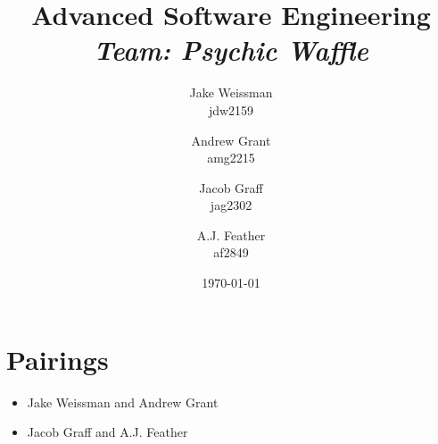 \documentclass[11pt]{article}
\title{
	Advanced Software Engineering\\
	\emph{Team: Psychic Waffle}
}
\author{
	Jake Weissman \\
	jdw2159 \\
	\and
	Andrew Grant \\
	amg2215 \\
	\and
	Jacob Graff \\
	jag2302 \\
	\and
	A.J. Feather \\
	af2849		
}
\date{\today}
\begin{document}
\maketitle

\section{Pairings}
\begin{itemize}
\item Jake Weissman and Andrew Grant
\item Jacob Graff and A.J. Feather
\end{itemize}
\end{document}
